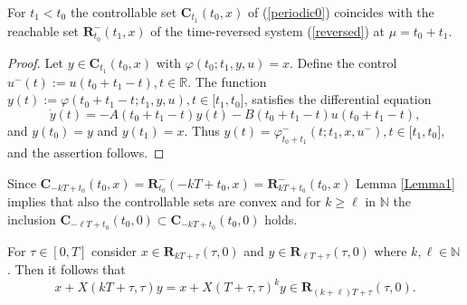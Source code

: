 \documentclass{siamltex}%
\begin{document}
\begin{lemma}
\label{Lemma2}For $t_{1}<t_{0}$ the controllable set $\mathbf{C}_{t_{1}}%
(t_{0},x)$ of (\ref{periodic0}) coincides with the reachable set
$\mathbf{R}_{t_{0}}^{-}(t_{1},x)$ of the time-reversed system (\ref{reversed})
at $\mu=t_{0}+t_{1}$.
\end{lemma}

\begin{proof}
Let $y\in\mathbf{C}_{t_{1}}(t_{0},x)$ with $\varphi(t_{0};t_{1},y,u)=x$.
Define the control $u^{-}(t):=u(t_{0}+t_{1}-t),t\in\mathbb{R}$. The function
$y(t):=\varphi(t_{0}+t_{1}-t;t_{1},y,u),t\in\lbrack t_{1},t_{0}]$, satisfies
the differential equation%
\[
\dot{y}(t)=-A(t_{0}+t_{1}-t)y(t)-B(t_{0}+t_{1}-t)u(t_{0}+t_{1}-t),
\]
and $y(t_{0})=y$ and $y(t_{1})=x$. Thus $y(t)=\varphi_{t_{0}+t_{1}}%
^{-}(t;t_{1},x,u^{-}),t\in\lbrack t_{1},t_{0}]$, and the assertion follows.
\end{proof}

Since $\mathbf{C}_{-kT+t_{0}}(t_{0},x)=\mathbf{R}_{t_{0}}^{-}(-kT+t_{0}%
,x)=\mathbf{R}_{kT+t_{0}}^{-}(t_{0},x)$ Lemma \ref{Lemma1} implies that also
the controllable sets are convex and for $k\geq\ell$ in $\mathbb{N}$ the
inclusion $\mathbf{C}_{-\ell T+t_{0}}(t_{0},0)\subset\mathbf{C}_{-kT+t_{0}%
}(t_{0},0)$ holds.

\begin{proposition}
\label{Proposition9_JDDE}For $\tau\in\left[  0,T\right]  $ consider
$x\in\mathbf{R}_{kT+\tau}(\tau,0)$ and $y\in\mathbf{R}_{\ell T+\tau}(\tau,0)$
where $k,\ell\in\mathbb{N}$. Then it follows that%
\begin{equation}
x+X(kT+\tau,\tau)y=x+X(T+\tau,\tau)^{k}y\in\mathbf{R}_{(k+\ell)T+\tau}%
(\tau,0). \label{2.6}%
\end{equation}

\end{proposition}
\end{document}
